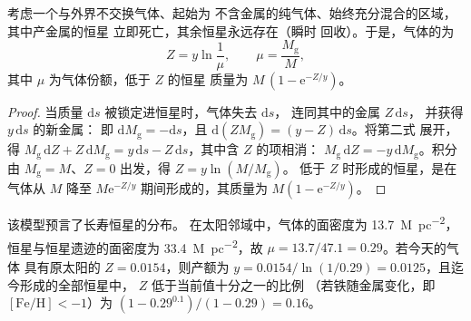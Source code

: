 \begin{theorem}[闭箱模型]\label{thm:b3:origin-of-elements:closed-box}
考虑一个与外界不交换气体、起始为
不含金属的纯气体、始终充分混合的区域，其中产金属的恒星
立即死亡，其余恒星永远存在（瞬时
回收）。于是，气体的为
\[
Z = y \ln\frac{1}{\mu}, \qquad \mu = \frac{M_\mathrm{g}}{M},
\]
其中 $\mu$ 为气体份额，低于 $Z$ 的恒星
质量为 \mbox{$M\,(1 - \mathrm{e}^{-Z/y})$}。
\end{theorem}

\begin{proof}
当质量 $\mathrm{d}s$ 被锁定进恒星时，气体失去 $\mathrm{d}s$，
连同其中的金属 $Z\,\mathrm{d}s$，
并获得 $y\,\mathrm{d}s$ 的新金属：
即 $\mathrm{d}M_\mathrm{g} = -\mathrm{d}s$，且
$\mathrm{d}(Z M_\mathrm{g}) = (y - Z)\,\mathrm{d}s$。将第二式
展开，得 $M_\mathrm{g}\,\mathrm{d}Z + Z\,\mathrm{d}M_\mathrm{g} =
y\,\mathrm{d}s - Z\,\mathrm{d}s$，其中含 $Z$ 的项相消：
$M_\mathrm{g}\,\mathrm{d}Z = -y\,\mathrm{d}M_\mathrm{g}$。积分
由 $M_\mathrm{g} = M$、$Z = 0$ 出发，得 $Z = y\ln(M/M_\mathrm{g})$。
低于 $Z$ 时形成的恒星，是在
气体从 $M$ 降至 $M\mathrm{e}^{-Z/y}$ 期间形成的，其质量为
$M(1 - \mathrm{e}^{-Z/y})$。
\end{proof}

该模型预言了长寿恒星的分布。
在太阳邻域中，气体的面密度为
\qty{13.7}{M_\odot.pc^{-2}}，恒星与恒星遗迹的面密度为
\qty{33.4}{M_\odot.pc^{-2}}，故 $\mu = 13.7/47.1 = 0.29$。若今天的气体
具有原太阳的 $Z = 0.0154$，则产额为
$y = 0.0154/\ln(1/0.29) = 0.0125$，且迄今形成的全部恒星中，
 $Z$ 低于当前值十分之一的比例
（若铁随金属变化，即 $[\mathrm{Fe/H}] < -1$）为
$(1 - 0.29^{0.1})/(1 - 0.29) = 0.16$。

